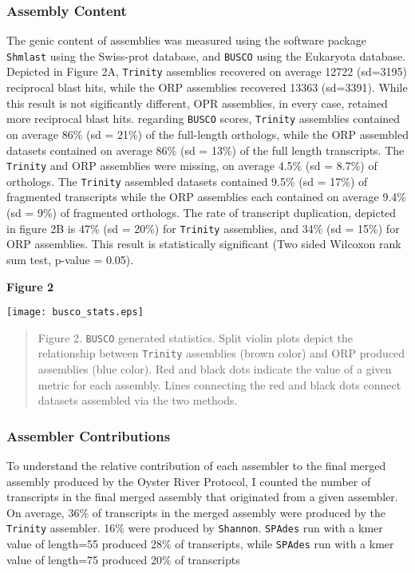 \documentclass[10pt,letterpaper]{article}
\begin{document}
\subsubsection{Assembly Content}

The genic content of assemblies was measured using the software package \texttt{Shmlast} using the Swiss-prot database, and \texttt{BUSCO} using the Eukaryota database. Depicted in Figure 2A, \texttt{Trinity} assemblies recovered on average 12722 (sd=3195) reciprocal blast hits, while the ORP assemblies recovered 13363 (sd=3391). While this result is not sigificantly different, OPR assemblies, in every case, retained more reciprocal blast hits. regarding \texttt{BUSCO} scores, \texttt{Trinity} assemblies contained on average 86\% (sd = 21\%) of the full-length orthologs, while the ORP assembled datasets contained on average 86\% (sd = 13\%) of the full length transcripts. The \texttt{Trinity} and ORP assemblies were missing, on average 4.5\% (sd = 8.7\%) of orthologs. The \texttt{Trinity} assembled datasets contained 9.5\% (sd = 17\%) of fragmented transcripts while the ORP assemblies each contained on average 9.4\% (sd = 9\%) of fragmented orthologs. The rate of transcript duplication, depicted in figure 2B is 47\% (sd = 20\%) for \texttt{Trinity} assemblies, and 34\% (sd = 15\%) for ORP assemblies.  This result is statistically significant (Two sided Wilcoxon rank sum test, p-value = 0.05).

\textbf{\hypertarget{Figure 2}{Figure 2}} \\
\centerline{\texttt{[image: busco\_stats.eps]}}
\begin{quote}
\small{Figure 2. \texttt{BUSCO} generated statistics. Split violin plots depict the relationship between \texttt{Trinity} assemblies (brown color) and ORP produced assemblies (blue color). Red and black dots indicate the value of a given metric for each assembly. Lines connecting the red and black dots connect datasets assembled via the two methods.}
\end{quote} 

\subsubsection{Assembler Contributions}

To understand the relative contribution of each assembler to the final merged assembly produced by the Oyster River Protocol, I counted the number of transcripts in the final merged assembly that originated from a given assembler. On average, 36\% of transcripts in the merged assembly were produced by the \texttt{Trinity} assembler. 16\% were produced by \texttt{Shannon}. \texttt{SPAdes} run with a kmer value of length=55 produced 28\% of transcripts, while \texttt{SPAdes} run with a kmer value of length=75 produced 20\% of transcripts 
\end{document}
